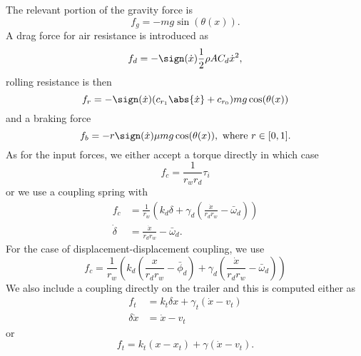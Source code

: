 \documentclass[10pt,notitlepage,abstracton]{scrartcl}
\theoremstyle{plain}
\theoremstyle{plain}
\theoremstyle{plain}
\begin{document}
The relevant portion of the gravity force is
\begin{equation}
  \label{eq:1}
  f_{g} = - m g \sin(\theta ( x ) ).
\end{equation}
A drag force for air resistance is introduced as
\begin{equation}
  \label{eq:2}
  f_{d} = - \sign(\dot{x}) \frac{1}{2}\rho A C_{d} \dot{x}^{2},  
\end{equation}
rolling resistance is then
\begin{equation}
  \label{eq:3}
  f_{r} = - \sign(\dot{x})(c_{r_{1}}\abs{\dot{x}} + c_{r_{0}}) m g \cos(\theta(x))
\end{equation}
and a braking force
\begin{equation}
  \label{eq:4}
  f_{b} = - r \sign(\dot{x})\mu m g \cos(\theta(x)), \text{ where }   r\in[0,1].
\end{equation}
As for the input forces, we either accept a torque directly in which case
\begin{equation}
  \label{eq:5}
  f_{c} = \frac{1}{r_{w}r_{d}}\tau_{i}
\end{equation}
or we use a coupling spring with
\begin{equation}
  \label{eq:6}
  \begin{split}
    f_{c} &= \frac{1}{r_{w}} \left(  k_{d} \delta 
      +\gamma_{d}( \frac{\dot{x}}{r_{d}r_{w}} - \bar{\omega}_{d} ) \right) \\
    \dot{\delta} &= \frac{\dot{x}}{r_{d}r_{w}} - \bar{\omega}_{d}. 
  \end{split}
\end{equation}
For the case of displacement-displacement coupling, we use 
\begin{equation}
  \label{eq:8}
    f_{c} = \frac{1}{r_{w}} \left( k_{d} (\frac{x}{r_{d}r_{w}} - \bar{\phi}_{d})  
      +\gamma_{d}( \frac{\dot{x}}{r_{d}r_{w}} - \bar{\omega}_{d} ) \right) 
\end{equation}
We also include a coupling directly on the trailer and this is computed
either as
\begin{equation}
  \label{eq:9}
  \begin{split}
    f_{t} &=  k_{t} \delta x + \gamma_{t}(\dot{x} - v_{t}) \\
    \delta\dot{x} &= \dot{x} - v_{t}
  \end{split}
\end{equation}
or
\begin{equation}
  \label{eq:10}
  f_{t}  = k_{t}(x-x_{t}) + \gamma( \dot{x} - v_{t}).
\end{equation}
\end{document}
